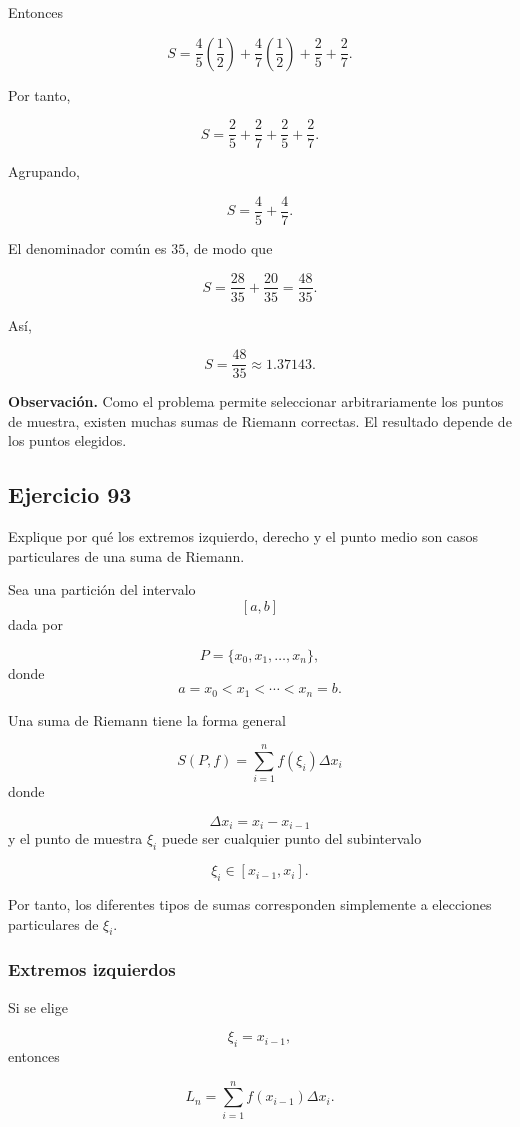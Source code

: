 \documentclass[12pt]{article}
\begin{document}
Entonces

\[S=\frac45\left(\frac12\right)+\frac47\left(\frac12\right)+\frac25+\frac27.\]

Por tanto,

\[S=\frac25+\frac27+\frac25+\frac27.\]

Agrupando,

\[S=\frac45+\frac47.\]

El denominador común es \(35\), de modo que

\[
S
=
\frac{28}{35}+\frac{20}{35}
=
\frac{48}{35}.
\]

Así,

\[\boxed{S=\frac{48}{35}\approx1.37143}.\]

\textbf{Observación.}
Como el problema permite seleccionar arbitrariamente los puntos de
muestra, existen muchas sumas de Riemann correctas. El resultado depende
de los puntos elegidos.

\subsection*{Ejercicio 93}

Explique por qué los extremos izquierdo, derecho y el punto medio son
casos particulares de una suma de Riemann.

Sea una partición del intervalo
\[[a,b]\]
dada por

\[P=\{x_0,x_1,\ldots,x_n\},\]
donde
\[a=x_0<x_1<\cdots<x_n=b.\]

Una suma de Riemann tiene la forma general

\[\boxed{S(P,f)=\sum_{i=1}^{n}f(\xi_i)\Delta x_i}\]
donde

\[
\Delta x_i=x_i-x_{i-1}
\]
y el punto de muestra \(\xi_i\) puede ser cualquier punto del
subintervalo

\[
\xi_i\in[x_{i-1},x_i].
\]

Por tanto, los diferentes tipos de sumas corresponden simplemente a
elecciones particulares de \(\xi_i\).

\subsubsection*{Extremos izquierdos}

Si se elige

\[
\xi_i=x_{i-1},
\]
entonces

\[
L_n
=
\sum_{i=1}^{n}
f(x_{i-1})\Delta x_i.
\]
\end{document}
